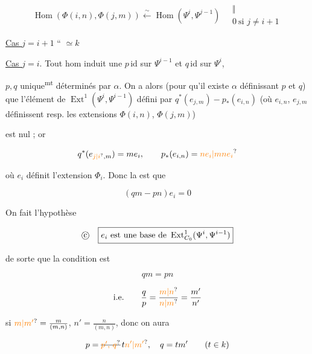 \[\operatorname{Hom}(\Phi(i,n),\Phi(j,m))\xleftarrow{\sim}\operatorname{Hom}(\Psi^i,\Psi^{j-1})\quad\begin{matrix}\Vert\\0\ \text{si }j\ne i+1\end{matrix}\]

\uline{Cas $j=i+1$} \quad \textquotedblleft\quad \unsure{\textquotedblright} $\simeq k$

\uline{Cas $j=i$}. Tout hom induit une $p\,\mathrm{id}$ sur $\Psi^{i-1}$ et $q\,\mathrm{id}$ sur $\Psi^{i}$,


$p,q$ unique\textsuperscript{mt} déterminés par $\alpha$. On a alors (pour qu'il existe $\alpha$ définissant $p$ et $q$) que l'élément de $\operatorname{Ext}^1(\Psi^i,\Psi^{i-1})$ défini par $q^*(e_{j,m})-p_*(e_{i,n})$ (où $e_{i,n}$, $e_{j,m}$ définissent resp. les extensions $\Phi(i,n)$, $\Phi(j,m)$)


est nul ; or

\[q^*(e_{\unsure{j|i},m})=m e_i,\qquad p_*(e_{i,n})=\unsure{n e_i|mn e_i}\]

où $e_i$ définit l'extension $\Phi_i$. Donc la  est que

\[(qm-pn)e_i=0\]

On fait l'hypothèse

\[\text{\textcircled{c}}\quad\boxed{e_i\ \text{est une base de }\operatorname{Ext}^{1}_{C_0}(\Psi^i,\Psi^{i-1})}\]

de sorte que la condition  est

\[ qm=pn \]

\[ \text{i.e.}\qquad \frac qp=\frac{\unsure{m|n}}{\unsure{n|m}}=\frac{m'}{n'} \]

si $\unsure{m|m'}=\frac{m}{(m,n)}$, $n'=\frac{n}{(m,n)}$, donc on aura

\[p=\deleted{\unsure{p',\,q}}\,t\unsure{n'|m'},\quad q=tm'\qquad (t\in k)\]

